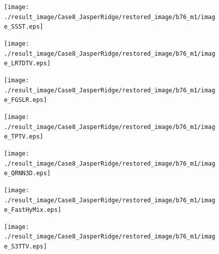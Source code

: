 \begin{figure}[t]
\begin{center}
		\begin{minipage}{0.125\hsize}
			\centerline{\texttt{[image: ./result\_image/Case8\_JasperRidge/restored\_image/b76\_m1/image\_SSST.eps]}} %
		\end{minipage}
		\begin{minipage}{0.125\hsize}
			\centerline{\texttt{[image: ./result\_image/Case8\_JasperRidge/restored\_image/b76\_m1/image\_LRTDTV.eps]}} %
		\end{minipage}
		\begin{minipage}{0.125\hsize}
			\centerline{\texttt{[image: ./result\_image/Case8\_JasperRidge/restored\_image/b76\_m1/image\_FGSLR.eps]}} %
		\end{minipage}
		\begin{minipage}{0.125\hsize}
			\centerline{\texttt{[image: ./result\_image/Case8\_JasperRidge/restored\_image/b76\_m1/image\_TPTV.eps]}} %
		\end{minipage}
		\begin{minipage}{0.125\hsize}
			\centerline{\texttt{[image: ./result\_image/Case8\_JasperRidge/restored\_image/b76\_m1/image\_QRNN3D.eps]}} %
		\end{minipage}
		\begin{minipage}{0.125\hsize}
			\centerline{\texttt{[image: ./result\_image/Case8\_JasperRidge/restored\_image/b76\_m1/image\_FastHyMix.eps]}} %
		\end{minipage}
		\begin{minipage}{0.125\hsize}
			\centerline{\texttt{[image: ./result\_image/Case8\_JasperRidge/restored\_image/b76\_m1/image\_S3TTV.eps]}} %
		\end{minipage}
		\begin{minipage}{0.050\hsize}
			\centerline{\hspace{\hsize}} %
		\end{minipage}
		
		\vspace{1mm}
		

\end{center}
\end{figure}
